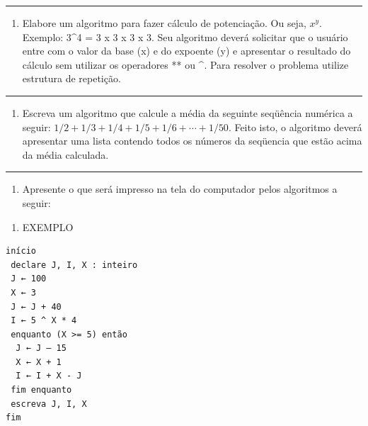 \documentclass[12pt,a4paper]{article}
\providecommand{\tightlist}{%
      \setlength{\itemsep}{0pt}\setlength{\parskip}{0pt}}
\begin{document}
    \begin{center}\rule{0.5\linewidth}{0.5pt}\end{center}

\begin{enumerate}
\def\labelenumi{\arabic{enumi}.}
\setcounter{enumi}{1}
\tightlist
\item
  Elabore um algoritmo para fazer cálculo de potenciação. Ou seja,
  \(x^y\). Exemplo: 3\^{}4 = 3 x 3 x 3 x 3. Seu algoritmo deverá
  solicitar que o usuário entre com o valor da base (x) e do expoente
  (y) e apresentar o resultado do cálculo sem utilizar os operadores **
  ou \^{}. Para resolver o problema utilize estrutura de repetição.
\end{enumerate}

    \begin{center}\rule{0.5\linewidth}{0.5pt}\end{center}

\begin{enumerate}
\def\labelenumi{\arabic{enumi}.}
\setcounter{enumi}{2}
\tightlist
\item
  Escreva um algoritmo que calcule a média da seguinte seqüência
  numérica a seguir: \(1/2 + 1/3 + 1/4 + 1/5 + 1/6 + \cdots + 1/50\).
  Feito isto, o algoritmo deverá apresentar uma lista contendo todos os
  números da seqüencia que estão acima da média calculada.
\end{enumerate}

    \begin{center}\rule{0.5\linewidth}{0.5pt}\end{center}

\begin{enumerate}
\def\labelenumi{\arabic{enumi}.}
\setcounter{enumi}{3}
\tightlist
\item
  Apresente o que será impresso na tela do computador pelos algoritmos a
  seguir:
\end{enumerate}

\begin{enumerate}
\def\labelenumi{\alph{enumi})}
\tightlist
\item
  EXEMPLO
\end{enumerate}

\begin{verbatim}
início
 declare J, I, X : inteiro
 J ← 100
 X ← 3
 J ← J + 40
 I ← 5 ^ X * 4
 enquanto (X >= 5) então
  J ← J – 15
  X ← X + 1
  I ← I + X - J
 fim enquanto
 escreva J, I, X
fim 
\end{verbatim}
\end{document}
